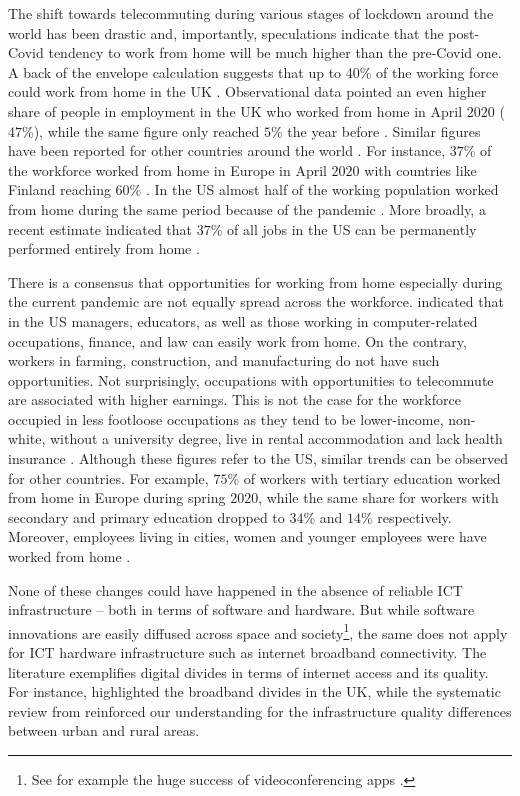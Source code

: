 \documentclass[]{interact}
\theoremstyle{plain}%
\theoremstyle{definition}
\theoremstyle{remark}
\begin{document}
The shift towards telecommuting during various stages of lockdown around
the world has been drastic and, importantly, speculations indicate that
the post-Covid tendency to work from home will be much higher than the
pre-Covid one. A back of the envelope calculation suggests that up to
40\% of the working force could work from home in the UK
\citep{batty2020editorial}. Observational data pointed an even higher
share of people in employment in the UK who worked from home in April
\(2020\) (\(47\)\%), while the same figure only reached \(5\)\% the year
before \citep{ons2020, ons2020lm2019}. Similar figures have been
reported for other countries around the world
\citep{felstead2020homeworking}. For instance, \(37\)\% of the workforce
worked from home in Europe in April \(2020\) with countries like Finland
reaching \(60\)\% \citep{eurofound2020}. In the US almost half of the
working population worked from home during the same period because of
the pandemic \citep{brynjolfsson2020covid}. More broadly, a recent
estimate indicated that \(37\)\% of all jobs in the US can be
permanently performed entirely from home \citep{NBERw26948}.

There is a consensus that opportunities for working from home especially
during the current pandemic are not equally spread across the workforce.
\citet{NBERw26948} indicated that in the US managers, educators, as well
as those working in computer-related occupations, finance, and law can
easily work from home. On the contrary, workers in farming,
construction, and manufacturing do not have such opportunities. Not
surprisingly, occupations with opportunities to telecommute are
associated with higher earnings. This is not the case for the workforce
occupied in less footloose occupations as they tend to be lower-income,
non-white, without a university degree, live in rental accommodation and
lack health insurance \citep{NBERw27085}. Although these figures refer
to the US, similar trends can be observed for other countries. For
example, \(75\)\% of workers with tertiary education worked from home in
Europe during spring \(2020\), while the same share for workers with
secondary and primary education dropped to \(34\)\% and \(14\)\%
respectively. Moreover, employees living in cities, women and younger
employees were have worked from home \citep{eurofound2020}.

None of these changes could have happened in the absence of reliable ICT
infrastructure -- both in terms of software and hardware. But while
software innovations are easily diffused across space and
society\footnote{See for example the huge success of videoconferencing
  apps \citep{marks2020zoom}.}, the same does not apply for ICT hardware
infrastructure such as internet broadband connectivity. The literature
exemplifies digital divides in terms of internet access and its quality.
For instance, \citet{riddlesden2014broadband} highlighted the broadband
divides in the UK, while the systematic review from
\citet{SALEMINK2017360} reinforced our understanding for the
infrastructure quality differences between urban and rural areas.
\end{document}
